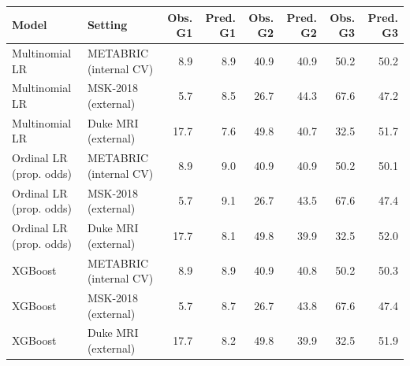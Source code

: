 \begin{tabular}{llrrrrrr}
\toprule
Model & Setting & Obs. G1 & Pred. G1 & Obs. G2 & Pred. G2 & Obs. G3 & Pred. G3 \\
\midrule
Multinomial LR & METABRIC (internal CV) & 8.9 & 8.9 & 40.9 & 40.9 & 50.2 & 50.2 \\
Multinomial LR & MSK-2018 (external) & 5.7 & 8.5 & 26.7 & 44.3 & 67.6 & 47.2 \\
Multinomial LR & Duke MRI (external) & 17.7 & 7.6 & 49.8 & 40.7 & 32.5 & 51.7 \\
Ordinal LR (prop. odds) & METABRIC (internal CV) & 8.9 & 9.0 & 40.9 & 40.9 & 50.2 & 50.1 \\
Ordinal LR (prop. odds) & MSK-2018 (external) & 5.7 & 9.1 & 26.7 & 43.5 & 67.6 & 47.4 \\
Ordinal LR (prop. odds) & Duke MRI (external) & 17.7 & 8.1 & 49.8 & 39.9 & 32.5 & 52.0 \\
XGBoost & METABRIC (internal CV) & 8.9 & 8.9 & 40.9 & 40.8 & 50.2 & 50.3 \\
XGBoost & MSK-2018 (external) & 5.7 & 8.7 & 26.7 & 43.8 & 67.6 & 47.4 \\
XGBoost & Duke MRI (external) & 17.7 & 8.2 & 49.8 & 39.9 & 32.5 & 51.9 \\
\bottomrule
\end{tabular}